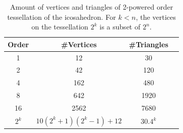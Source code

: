 \documentclass[twoside,twocolumn,10pt]{article}
\begin{document}

\begin{table}[]
\centering
\begin{tabular}{|c|c|c|c|}
\hline
\textbf{Order} & \textbf{\#Vertices} & \textbf{\#Triangles} \\ \hline
1              & 12                 & 30                  \\ \hline
2              & 42                 & 120                 \\ \hline
4              & 162                & 480                 \\ \hline
8              & 642                & 1920                \\ \hline
16             & 2562               & 7680                \\ \hline
$2^k$          & $10(2^k+1)(2^k-1)+12$ & $30.4^k$           \\ \hline
\end{tabular}
\caption{Amount of vertices and triangles of 2-powered order tessellation of the icosahedron. For $k<n$, the vertices on the tessellation $2^k$ is a subset of $2^n$.}
\label{tab::icosahedron_set}
\end{table}



\end{document}
